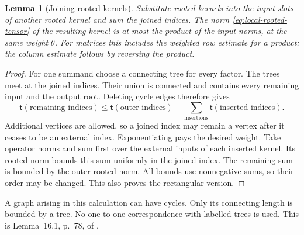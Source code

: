 \documentclass[11pt,reqno]{amsart}
\numberwithin{equation}{section}
\newtheorem{lemma}[theorem]{Lemma}
\theoremstyle{definition}
\theoremstyle{remark}
\begin{document}
\begin{lemma}[Joining rooted kernels]
\label{lem:local-rooted-joining}
Substitute rooted kernels into the input slots of another
rooted kernel and sum the joined indices.
The norm \eqref{eq:local-rooted-tensor} of the resulting
kernel is at most the product of the input norms, at
the same weight \(\theta\).
For matrices this includes the weighted row estimate
for a product; the column estimate follows by reversing
the product.
\end{lemma}
\begin{proof}
For one summand choose a connecting tree for every
factor. The trees meet at the joined indices.
Their union is connected and contains every remaining
input and the output root. Deleting cycle edges
therefore gives
\[
 \mathsf t(\text{remaining indices})
       \le \mathsf t(\text{outer indices})
            +\sum_{\text{insertions}}
                          \mathsf t(\text{inserted indices}).
\]
Additional vertices are allowed, so a joined index
may remain a vertex after it ceases to be an external
index. Exponentiating pays the desired weight.
Take operator norms and sum first over the external
inputs of each inserted kernel. Its rooted norm bounds
this sum uniformly in the joined index.
The remaining sum is bounded by the outer rooted norm.
All bounds use nonnegative sums, so their order may
be changed. This also proves the rectangular version.
\end{proof}

A graph arising in this calculation can have cycles.
Only its connecting length is bounded by a tree.
No one-to-one correspondence with labelled trees is
used. This is Lemma~16.1, p.~78, of \cite{Main}.
\end{document}
